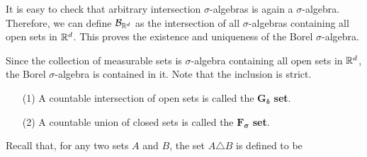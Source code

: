 \documentclass[12pt, a4paper, openany, twoside]{book}
\theoremstyle{definition}
\theoremstyle{remark}
\theoremstyle{plain}
\numberwithin{equation}{section}
\begin{document}
\vspace{5mm}
It is easy to check that arbitrary intersection $\sigma$-algebras is again a $\sigma$-algebra. Therefore, we can define $\mathcal{B}_{{\mathbb {R}}^d}$ as the intersection of all $\sigma$-algebras containing all open sets in ${\mathbb {R}}^d$. This proves the existence and uniqueness of the Borel $\sigma$-algebra.

Since the collection of measurable sets is $\sigma$-algebra containing all open sets in ${\mathbb {R}}^d$, the Borel $\sigma$-algebra is contained in it. Note that the inclusion is strict.

\vspace{5mm}
\begin{tcolorbox}[colback=yellow!10!white,colframe=blue!75!black,title=Definition 1.3.5]\label{Definition 1.3.5}
    \begin{enumerate}
        \item [(1)] A countable intersection of open sets is called the $\bm{G_\delta}$ \textbf{set}.
        \item [(2)] A countable union of closed sets is called the $\bm{F_\sigma}$ \textbf{set}.
    \end{enumerate}
\end{tcolorbox}
\vspace{5mm}
Recall that, for any two sets $A$ and $B$, the set $A\triangle B$ is defined to be 
\end{document}
